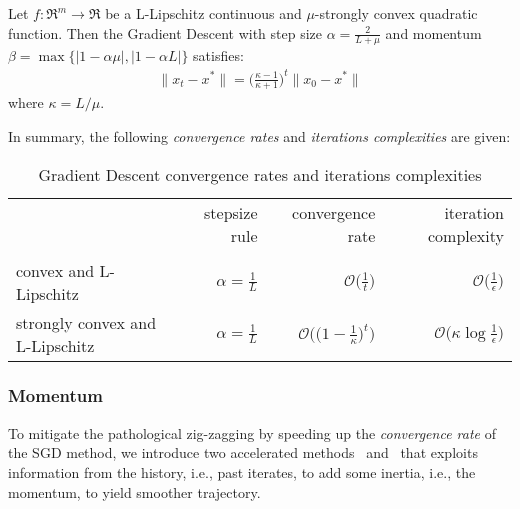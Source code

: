 \begin{theorem}[\href{https://angms.science/doc/CVX/CVX_HBM.pdf\#page=5}{Gradient Descent convergence for convex quadratic functions}] \label{thm:quad_gd_convergence}
Let $f: \Re^m \rightarrow \Re$ be a L-Lipschitz continuous and $\mu$-strongly convex quadratic function. Then the Gradient Descent with step size $\alpha = \displaystyle \frac{2}{L + \mu}$ and momentum $\beta = \max{\{|1 - \alpha \mu|, |1 - \alpha L|\}}$ satisfies:
$$
\begin{aligned}
	\| x_t - x^* \| = \bigg(\frac{\kappa-1}{\kappa+1}\bigg)^t \| x_0 - x^* \|
\end{aligned}
$$
where $\kappa = L/\mu$.
\end{theorem}

In summary, the following \emph{convergence rates} and \emph{iterations complexities} are given:

\begin{table}[H]
\centering
\caption{Gradient Descent convergence rates and iterations complexities}
\label{gradient_rates}
\begin{tabular}{lrrr}
\toprule
	& stepsize rule & convergence rate & iteration complexity \\
 	& 		& 		& 		\\
\midrule
convex and L-Lipschitz & $\displaystyle \alpha = \frac{1}{L}$ & $\displaystyle \mathcal{O}\Bigg(\frac{1}{t}\Bigg)$ & $\displaystyle \mathcal{O}\Bigg(\frac{1}{\epsilon}\Bigg)$ \\
strongly convex and L-Lipschitz & $\displaystyle \alpha = \frac{1}{L}$ & $\displaystyle \mathcal{O}\Bigg(\Bigg(1 - \frac{1}{\kappa}\Bigg)^t\Bigg)$ & $\displaystyle \mathcal{O}\Bigg(\kappa \log \frac{1}{\epsilon}\Bigg)$ \\
\bottomrule
\end{tabular}
\end{table}


\subsubsection{Momentum}

To mitigate the pathological zig-zagging by speeding up the \emph{convergence rate} of the SGD method, we introduce two accelerated methods~\cite{polyak1964some} and~\cite{nesterov1998introductory, nesterov1983method} that exploits information from the history, i.e., past iterates, to add some inertia, i.e., the momentum, to yield smoother trajectory.

